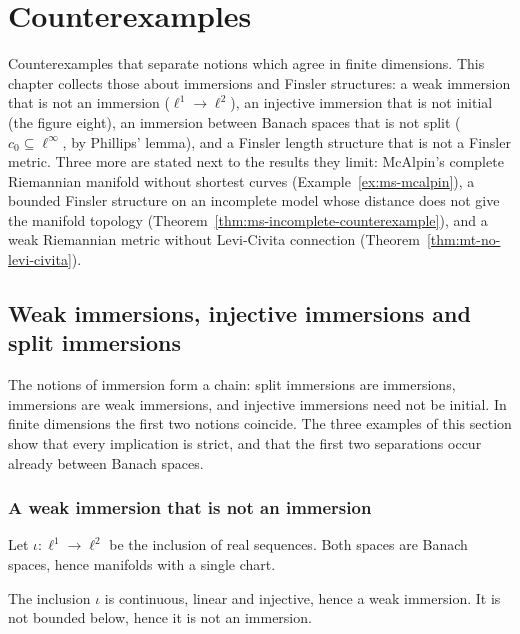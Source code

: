\chapter{Counterexamples}
\label{chap:counterexamples}

Counterexamples that separate notions which agree in finite dimensions. This chapter collects
those about immersions and Finsler structures: a weak immersion that is not an immersion
($\ell^1 \to \ell^2$), an injective immersion that is not initial (the figure eight), an
immersion between Banach spaces that is not split ($c_0 \subseteq \ell^\infty$, by Phillips'
lemma), and a Finsler length structure that is not a Finsler metric. Three more are stated next
to the results they limit: McAlpin's complete Riemannian manifold without shortest curves
(Example~\ref{ex:ms-mcalpin}), a bounded Finsler structure on an incomplete model whose distance
does not give the manifold topology (Theorem~\ref{thm:ms-incomplete-counterexample}), and a weak
Riemannian metric without Levi-Civita connection (Theorem~\ref{thm:mt-no-levi-civita}).

\section{Weak immersions, injective immersions and split immersions}

The notions of immersion form a chain: split immersions are immersions,
immersions are weak immersions, and injective immersions need not be initial. In finite
dimensions the first two notions coincide. The three examples of this section show that every
implication is strict, and that the first two separations occur already between Banach spaces.

\subsection{A weak immersion that is not an immersion}

Let $\iota \colon \ell^1 \to \ell^2$ be the inclusion of real sequences. Both spaces are Banach
spaces, hence manifolds with a single chart.

\begin{proposition}
  \label{prop:ex-l1-l2}
  \leanok
  The inclusion $\iota$ is continuous, linear and injective, hence a weak immersion. It is not
  bounded below, hence it is not an immersion.
\end{proposition}

